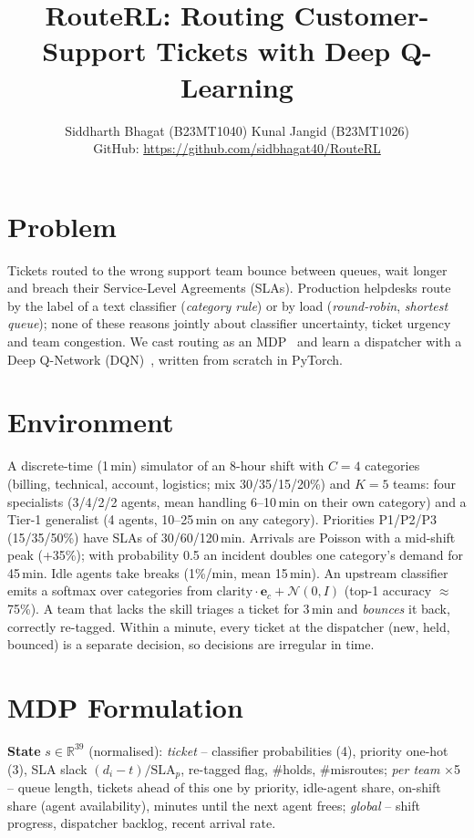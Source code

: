 \documentclass[10pt,twocolumn]{article}
\title{\vspace{-1.6em}\textbf{RouteRL: Routing Customer-Support Tickets with Deep Q-Learning}\vspace{-0.6em}}
\author{\small Siddharth Bhagat (B23MT1040) \quad Kunal Jangid (B23MT1026)\\
\small GitHub: \url{https://github.com/sidbhagat40/RouteRL}\vspace{-1.0em}}
\date{}
\begin{document}
\maketitle

\section{Problem}
Tickets routed to the wrong support team bounce between queues, wait longer and breach their
Service-Level Agreements (SLAs). Production helpdesks route by the label of a text classifier
(\emph{category rule}) or by load (\emph{round-robin}, \emph{shortest queue}); none of these
reasons jointly about classifier uncertainty, ticket urgency and team congestion. We cast routing
as an MDP~\cite{sutton2018} and learn a dispatcher with a Deep Q-Network (DQN)~\cite{mnih2015},
written from scratch in PyTorch.

\section{Environment}
A discrete-time (1\,min) simulator of an 8-hour shift with $C{=}4$ categories (billing,
technical, account, logistics; mix 30/35/15/20\%) and $K{=}5$ teams: four specialists
(3/4/2/2 agents, mean handling 6--10\,min on their own category) and a Tier-1 generalist
(4 agents, 10--25\,min on any category). Priorities P1/P2/P3 (15/35/50\%) have SLAs of
30/60/120\,min. Arrivals are Poisson with a mid-shift peak (+35\%); with probability 0.5 an
incident doubles one category's demand for 45\,min. Idle agents take breaks (1\%/min,
mean 15\,min). An upstream classifier emits a softmax over categories from
$\text{clarity}\cdot\mathbf{e}_c+\mathcal{N}(0,I)$ (top-1 accuracy $\approx$75\%). A team that lacks
the skill triages a ticket for 3\,min and \emph{bounces} it back, correctly re-tagged. Within a
minute, every ticket at the dispatcher (new, held, bounced) is a separate decision, so decisions
are irregular in time.

\section{MDP Formulation}
\textbf{State} $s\in\mathbb{R}^{39}$ (normalised): \emph{ticket} -- classifier probabilities (4),
priority one-hot (3), SLA slack $(d_i-t)/\text{SLA}_{p}$, re-tagged flag, \#holds,
\#misroutes; \emph{per team} $\times$5 -- queue length, tickets ahead of this one by priority,
idle-agent share, on-shift share (agent availability), minutes until the next agent frees;
\emph{global} -- shift progress, dispatcher backlog, recent arrival rate.
\end{document}

